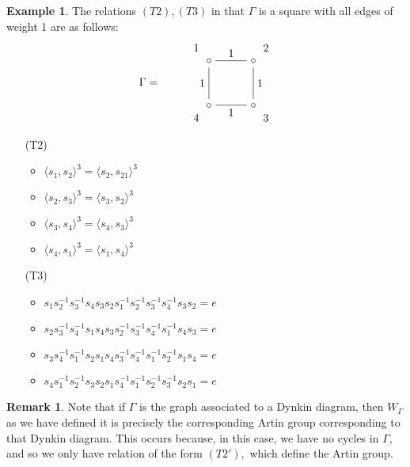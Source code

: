 \documentclass[11pt]{amsart}
\theoremstyle{definition}
\newtheorem{ex}[thm]{Example}
\newtheorem{rem}[thm]{Remark}
\begin{document}
\begin{ex}
The relations $(T2),(T3)$ in that $\Gamma$ is a square with all edges of weight 1 are as follows:
\[\Gamma =\begin{tikzpicture}[baseline=-0.5ex]
\matrix[matrix of math nodes,column sep={40pt,between origins},row
sep={40pt,between origins},nodes={asymmetrical rectangle}] at (6,0)
{
& |[name = ul]|\circ& |[name = ur]|\circ\\
%
&|[name=dl]| \circ &|[name=dr]| \circ \\
};
\draw
(ul) -- node[above] {1} (ur)
;
\draw
(dl) -- node[left]{1}(ul)
;
\draw
(dr) -- node[below]{1}(dl)
;
\draw
(ur) -- node[right]{1} (dr)
;
\node [yshift = .4 cm,xshift = -.4 cm] at (ul){1};
\node [yshift = .4 cm,xshift = .4 cm] at (ur){2};
\node [yshift = -.4 cm,xshift = .4 cm] at (dr){3};
\node [yshift = -.4 cm,xshift = -.4 cm] at (dl){4};
\end{tikzpicture}\]
   \begin{enumerate}
\item[(T2)]
\begin{itemize}
\item $\langle s_1,s_2 \rangle^3 = \langle s_2,s_21 \rangle^3$
\item $\langle s_2,s_3 \rangle^3 = \langle s_3,s_2 \rangle^3$
\item $\langle s_3,s_4 \rangle^3 = \langle s_4,s_3 \rangle^3$
\item $\langle s_4,s_1 \rangle^3 = \langle s_1,s_4 \rangle^3$
\end{itemize}
\item[(T3)]
\begin{itemize}
\item $s_{1}s_{2}^{-1}s_{3}^{-1}s_4s_{3}s_2s_1^{-1}s_2^{-1}s_3^{-1}s_4^{-1}s_3s_2 = e$
\item $s_{2}s_{3}^{-1}s_{4}^{-1}s_1s_{4}s_3s_2^{-1}s_3^{-1}s_4^{-1}s_1^{-1}s_4s_3 = e$
\item $s_{3}s_{4}^{-1}s_{1}^{-1}s_2s_{1}s_4s_3^{-1}s_4^{-1}s_1^{-1}s_2^{-1}s_1s_4 = e$
\item $s_{4}s_{1}^{-1}s_{2}^{-1}s_3s_{2}s_1s_4^{-1}s_1^{-1}s_2^{-1}s_3^{-1}s_2s_1 = e$
\end{itemize}
\end{enumerate}
\end{ex}




\begin{rem}
Note that if $\Gamma$ is the graph associated to a Dynkin diagram, then $W_\Gamma$ as we have defined it is precisely the corresponding Artin group corresponding to that Dynkin diagram. This occurs because, in this case, we have no cycles in $\Gamma,$ and so we only have relation of the form $(T2'),$ which define the Artin group.
\end{rem}
\end{document}
